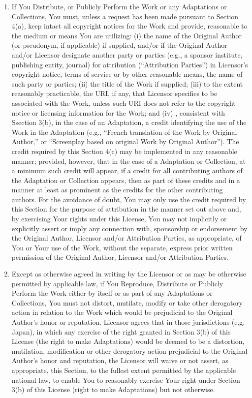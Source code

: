 \documentclass[letterpaper,10pt,english]{manual}
\begin{document}
\begin{enumerate}
\begin{enumerate}
\item {} 
If You Distribute, or Publicly Perform the Work or any Adaptations or Collections, You must, unless a request has been made pursuant to Section 4(a), keep intact all copyright notices for the Work and provide, reasonable to the medium or means You are utilizing: (i) the name of the Original Author (or pseudonym, if applicable) if supplied, and/or if the Original Author and/or Licensor designate another party or parties (e.g., a sponsor institute, publishing entity, journal) for attribution (``Attribution Parties'') in Licensor's copyright notice, terms of service or by other reasonable means, the name of such party or parties; (ii) the title of the Work if supplied; (iii) to the extent reasonably practicable, the URI, if any, that Licensor specifies to be associated with the Work, unless such URI does not refer to the copyright notice or licensing information for the Work; and (iv) , consistent with Ssection 3(b), in the case of an Adaptation, a credit identifying the use of the Work in the Adaptation (e.g., ``French translation of the Work by Original Author,'' or ``Screenplay based on original Work by Original Author''). The credit required by this Section 4(c) may be implemented in any reasonable manner; provided, however, that in the case of a Adaptation or Collection, at a minimum such credit will appear, if a credit for all contributing authors of the Adaptation or Collection appears, then as part of these credits and in a manner at least as prominent as the credits for the other contributing authors. For the avoidance of doubt, You may only use the credit required by this Section for the purpose of attribution in the manner set out above and, by exercising Your rights under this License, You may not implicitly or explicitly assert or imply any connection with, sponsorship or endorsement by the Original Author, Licensor and/or Attribution Parties, as appropriate, of You or Your use of the Work, without the separate, express prior written permission of the Original Author, Licensor and/or Attribution Parties.

\item {} 
Except as otherwise agreed in writing by the Licensor or as may be otherwise permitted by applicable law, if You Reproduce, Distribute or Publicly Perform the Work either by itself or as part of any Adaptations or Collections, You must not distort, mutilate, modify or take other derogatory action in relation to the Work which would be prejudicial to the Original Author's honor or reputation. Licensor agrees that in those jurisdictions (e.g. Japan), in which any exercise of the right granted in Section 3(b) of this License (the right to make Adaptations) would be deemed to be a distortion, mutilation, modification or other derogatory action prejudicial to the Original Author's honor and reputation, the Licensor will waive or not assert, as appropriate, this Section, to the fullest extent permitted by the applicable national law, to enable You to reasonably exercise Your right under Section 3(b) of this License (right to make Adaptations) but not otherwise.


\end{enumerate}
\end{enumerate}
\end{document}
